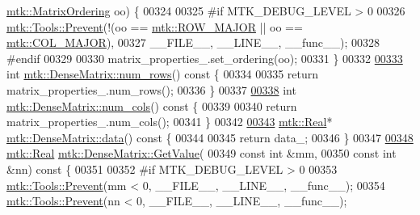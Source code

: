 \begin{DoxyCode}
      \hyperlink{group__c02-enums_ga622801bd9f912d0f976c3e383f5f581c}{mtk::MatrixOrdering} oo) \{
00324 
00325 \textcolor{preprocessor}{  #if MTK\_DEBUG\_LEVEL > 0}
00326   \hyperlink{classmtk_1_1Tools_afe5bb096309258e2e72503fd7b41c7e0}{mtk::Tools::Prevent}(!(oo == \hyperlink{namespacemtk_ga622801bd9f912d0f976c3e383f5f581cabc55178ac16eb1ce89b5f3ab915a91f3}{mtk::ROW\_MAJOR} || oo == 
      \hyperlink{namespacemtk_ga622801bd9f912d0f976c3e383f5f581ca7c11989c132253fb76b8f6b1314f7e13}{mtk::COL\_MAJOR}),
00327                       \_\_FILE\_\_, \_\_LINE\_\_, \_\_func\_\_);
00328 \textcolor{preprocessor}{  #endif}
00329 
00330   matrix\_properties\_.set\_ordering(oo);
00331 \}
00332 
\hypertarget{mtk__dense__matrix_8cc_source_l00333}{}\hyperlink{classmtk_1_1DenseMatrix_a17d8d3b9cc0926044b6972dd190a5c21}{00333} \textcolor{keywordtype}{int} \hyperlink{classmtk_1_1DenseMatrix_a17d8d3b9cc0926044b6972dd190a5c21}{mtk::DenseMatrix::num\_rows}()\textcolor{keyword}{ const }\{
00334 
00335   \textcolor{keywordflow}{return} matrix\_properties\_.num\_rows();
00336 \}
00337 
\hypertarget{mtk__dense__matrix_8cc_source_l00338}{}\hyperlink{classmtk_1_1DenseMatrix_af6f78373aaf2136f0c78974d7c8de0a8}{00338} \textcolor{keywordtype}{int} \hyperlink{classmtk_1_1DenseMatrix_af6f78373aaf2136f0c78974d7c8de0a8}{mtk::DenseMatrix::num\_cols}()\textcolor{keyword}{ const }\{
00339 
00340   \textcolor{keywordflow}{return} matrix\_properties\_.num\_cols();
00341 \}
00342 
\hypertarget{mtk__dense__matrix_8cc_source_l00343}{}\hyperlink{classmtk_1_1DenseMatrix_a16b3ff56feb2658b9fc7147d1de4d8e7}{00343} \hyperlink{group__c01-roots_gac080bbbf5cbb5502c9f00405f894857d}{mtk::Real}* \hyperlink{classmtk_1_1DenseMatrix_a16b3ff56feb2658b9fc7147d1de4d8e7}{mtk::DenseMatrix::data}()\textcolor{keyword}{ const }\{
00344 
00345   \textcolor{keywordflow}{return} data\_;
00346 \}
00347 
\hypertarget{mtk__dense__matrix_8cc_source_l00348}{}\hyperlink{classmtk_1_1DenseMatrix_a87fb785713c04b13767947cc3325ce7c}{00348} \hyperlink{group__c01-roots_gac080bbbf5cbb5502c9f00405f894857d}{mtk::Real} \hyperlink{classmtk_1_1DenseMatrix_a87fb785713c04b13767947cc3325ce7c}{mtk::DenseMatrix::GetValue}(
00349     \textcolor{keyword}{const} \textcolor{keywordtype}{int} &mm,
00350     \textcolor{keyword}{const} \textcolor{keywordtype}{int} &nn)\textcolor{keyword}{ const }\{
00351 
00352 \textcolor{preprocessor}{  #if MTK\_DEBUG\_LEVEL > 0}
00353   \hyperlink{classmtk_1_1Tools_afe5bb096309258e2e72503fd7b41c7e0}{mtk::Tools::Prevent}(mm < 0, \_\_FILE\_\_, \_\_LINE\_\_, \_\_func\_\_);
00354   \hyperlink{classmtk_1_1Tools_afe5bb096309258e2e72503fd7b41c7e0}{mtk::Tools::Prevent}(nn < 0, \_\_FILE\_\_, \_\_LINE\_\_, \_\_func\_\_);

\end{DoxyCode}
